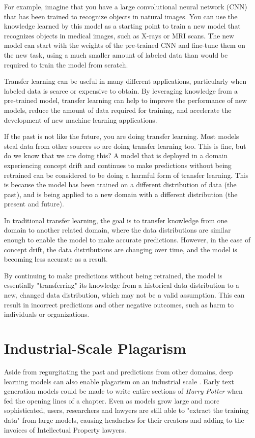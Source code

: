 For example, imagine that you have a large convolutional neural network (CNN) that has been trained to recognize objects in natural images. You can use the knowledge learned by this model as a starting point to train a new model that recognizes objects in medical images, such as X-rays or MRI scans. The new model can start with the weights of the pre-trained CNN and fine-tune them on the new task, using a much smaller amount of labeled data than would be required to train the model from scratch.

Transfer learning can be useful in many different applications, particularly when labeled data is scarce or expensive to obtain. By leveraging knowledge from a pre-trained model, transfer learning can help to improve the performance of new models, reduce the amount of data required for training, and accelerate the development of new machine learning applications.

If the past is not like the future, you are doing transfer learning. Most models steal data from other sources so are doing transfer learning too. This is fine, but do we know that we are doing this? A model that is deployed in a domain experiencing concept drift and continues to make predictions without being retrained can be considered to be doing a harmful form of transfer learning. This is because the model has been trained on a different distribution of data (the past), and is being applied to a new domain with a different distribution (the present and future).

In traditional transfer learning, the goal is to transfer knowledge from one domain to another related domain, where the data distributions are similar enough to enable the model to make accurate predictions. However, in the case of concept drift, the data distributions are changing over time, and the model is becoming less accurate as a result.

By continuing to make predictions without being retrained, the model is essentially "transferring" its knowledge from a historical data distribution to a new, changed data distribution, which may not be a valid assumption. This can result in incorrect predictions and other negative outcomes, such as harm to individuals or organizations.

\section{Industrial-Scale Plagarism}

Aside from regurgitating the past and predictions from other domains, deep learning models can also enable plagarism on an industrial scale . Early text generation models could be made to write entire sections of \textit{Harry Potter} when fed the opening lines of a chapter. Even as models grow large and more sophisticated, users, researchers and lawyers are still able to "extract the training data" from large models, causing headaches for their creators and adding to the invoices of Intellectual Property lawyers. 

